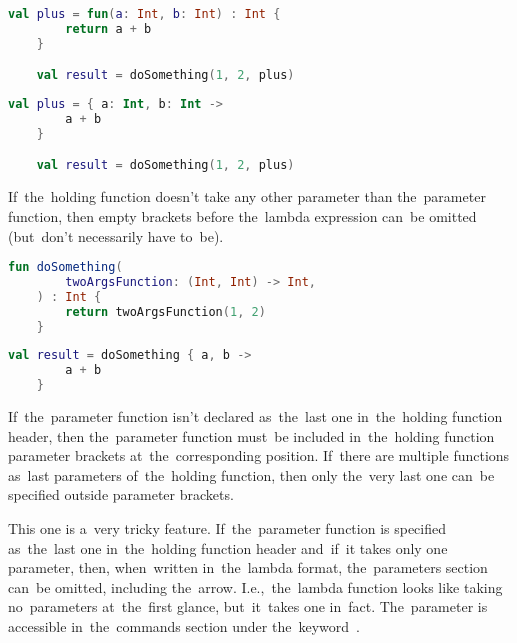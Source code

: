 \begin{lstlisting}[language=Kotlin, title={Equivalent with anonymous function in a variable -- parameter types must be used}]
    val plus = fun(a: Int, b: Int) : Int {
        return a + b
    }

    val result = doSomething(1, 2, plus)
\end{lstlisting}
\begin{lstlisting}[language=Kotlin, title={Equivalent with lambda function in a variable -- parameter types must be used}]
    val plus = { a: Int, b: Int ->
        a + b
    }

    val result = doSomething(1, 2, plus)
\end{lstlisting}
\newline

\noindent If~the~holding function doesn't take any other parameter than the~parameter function, then empty brackets before the~lambda expression can~be omitted (but~don't necessarily have \mbox{to be).}

\example
\begin{lstlisting}[language=Kotlin, title={Function taking other function as the~only parameter}]
    fun doSomething(
        twoArgsFunction: (Int, Int) -> Int,
    ) : Int {
        return twoArgsFunction(1, 2)
    }
\end{lstlisting}
\begin{lstlisting}[language=Kotlin, title={Usage}]
    val result = doSomething { a, b ->
        a + b
    }
\end{lstlisting}
\newline

\noindent If~the~parameter function isn't declared as~the~last one in~the~holding function header, then the~parameter function must~be included in~the~holding function parameter brackets at~the~corresponding position.
If~there are multiple functions as~last parameters of~the~holding function, then only the~very last one can~be specified outside parameter brackets.
\newpage

This one is a~very tricky feature.
If~the~parameter function is specified as~the~last one in~the~holding function header and~if~it takes only one parameter, then, when~written in~the~lambda format, the~parameters section can~be omitted, including the~arrow.
I.e.,~the~lambda function looks like taking no~parameters at~the~first glance, but~it~takes one in~fact.
The~parameter is accessible in~the~commands section under \mbox{the keyword }.


